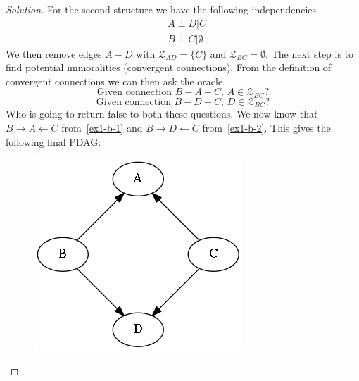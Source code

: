 \documentclass{amsart}
\theoremstyle{plain}
\newenvironment{solution}{\begin{proof}[Solution]}{\end{proof}}
\newcommand{\set}[1]{\mathcal{#1}}
\begin{document}
\begin{solution}
  For the second structure we have the following independencies
  \begin{align*}
    &A\perp D|C\\
    &B\perp C|\emptyset
  \end{align*}
  We then remove edges $A-D$ with $\set{Z}_{AD}=\{C\}$ and $\set{Z}_{BC}=\emptyset$. The next step
  is to find potential immoralities (convergent connections). From the definition of convergent
  connections we can then ask the oracle
  \begin{equation}
    \text{Given connection $B-A-C$,~} A\in \set{Z}_{BC}?\label{ex1-b-1}
  \end{equation}
  \begin{equation}
    \text{Given connection $B-D-C$,~} D\in \set{Z}_{BC}?\label{ex1-b-2}
  \end{equation}
  Who is going to return false to both these questions. We now know that $B\to A\gets C$
  from~\ref{ex1-b-1} and $B\to D\gets C$ from~\ref{ex1-b-2}. This gives the following final PDAG\@:
  \begin{figure}[h]
    \centering\includegraphics[scale=0.3]{graphs/ex1_b.png}
  \end{figure}


\end{solution}
\end{document}
